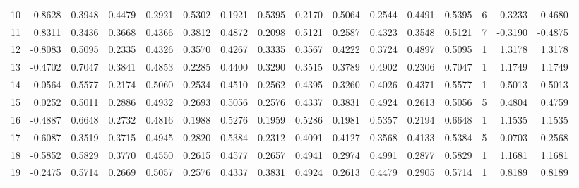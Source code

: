 \begin{tabular}{lrrrrrrrrrrrrrrr}
10 &      0.8628 &  0.3948 &  0.4479 &  0.2921 &  0.5302 &  0.1921 &  0.5395 &  0.2170 &  0.5064 &  0.2544 &   0.4491 &     0.5395 &      6 &                   -0.3233 &                    -0.4680 \\
11 &      0.8311 &  0.3436 &  0.3668 &  0.4366 &  0.3812 &  0.4872 &  0.2098 &  0.5121 &  0.2587 &  0.4323 &   0.3548 &     0.5121 &      7 &                   -0.3190 &                    -0.4875 \\
12 &     -0.8083 &  0.5095 &  0.2335 &  0.4326 &  0.3570 &  0.4267 &  0.3335 &  0.3567 &  0.4222 &  0.3724 &   0.4897 &     0.5095 &      1 &                    1.3178 &                     1.3178 \\
13 &     -0.4702 &  0.7047 &  0.3841 &  0.4853 &  0.2285 &  0.4400 &  0.3290 &  0.3515 &  0.3789 &  0.4902 &   0.2306 &     0.7047 &      1 &                    1.1749 &                     1.1749 \\
14 &      0.0564 &  0.5577 &  0.2174 &  0.5060 &  0.2534 &  0.4510 &  0.2562 &  0.4395 &  0.3260 &  0.4026 &   0.4371 &     0.5577 &      1 &                    0.5013 &                     0.5013 \\
15 &      0.0252 &  0.5011 &  0.2886 &  0.4932 &  0.2693 &  0.5056 &  0.2576 &  0.4337 &  0.3831 &  0.4924 &   0.2613 &     0.5056 &      5 &                    0.4804 &                     0.4759 \\
16 &     -0.4887 &  0.6648 &  0.2732 &  0.4816 &  0.1988 &  0.5276 &  0.1959 &  0.5286 &  0.1981 &  0.5357 &   0.2194 &     0.6648 &      1 &                    1.1535 &                     1.1535 \\
17 &      0.6087 &  0.3519 &  0.3715 &  0.4945 &  0.2820 &  0.5384 &  0.2312 &  0.4091 &  0.4127 &  0.3568 &   0.4133 &     0.5384 &      5 &                   -0.0703 &                    -0.2568 \\
18 &     -0.5852 &  0.5829 &  0.3770 &  0.4550 &  0.2615 &  0.4577 &  0.2657 &  0.4941 &  0.2974 &  0.4991 &   0.2877 &     0.5829 &      1 &                    1.1681 &                     1.1681 \\
19 &     -0.2475 &  0.5714 &  0.2669 &  0.5057 &  0.2576 &  0.4337 &  0.3831 &  0.4924 &  0.2613 &  0.4479 &   0.2905 &     0.5714 &      1 &                    0.8189 &                     0.8189 \\
\bottomrule
\end{tabular}
